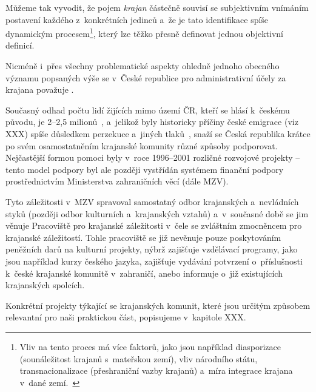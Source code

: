 Můžeme tak vyvodit, že pojem \emph{krajan} částečně souvisí se subjektivním vnímáním postavení každého z~konkrétních jedinců a~že je tato identifikace spíše dynamickým procesem\footnote{Vliv na tento proces má více faktorů, jako jsou například diasporizace (sounáležitost krajanů s~mateřskou zemí), vliv národního státu, transnacionalizace (přeshraniční vazby krajanů) a~míra integrace krajana v~dané zemí.~\parencite{Broucek2017}}, který lze těžko přesně definovat jednou objektivní definicí.

Nicméně i~přes všechny problematické aspekty ohledně jednoho obecného významu popsaných výše se v~České republice pro administrativní účely za krajana považuje .~\parencite{Krajane-mv1}

Současný odhad počtu lidí žijících mimo území ČR, kteří se hlásí k~českému původu, je 2--2,5 milionů~\parencite{Krajane-mv2}, a~jelikož byly historicky příčiny české emigrace (viz XXX) spíše důsledkem perzekuce a~jiných tlaků~\parencite{Vaculik2009a}, snaží se Česká republika krátce po svém osamostatněním krajanské komunity různé způsoby podporovat. Nejčastější formou pomoci byly v~roce 1996--2001 rozličné rozvojové projekty -- tento model podpory byl ale později vystřídán systémem finanční podpory prostřednictvím Ministerstva zahraničních věcí (dále MZV).~\parencite{Broucek2009}

Tyto záležitosti v~MZV spravoval samostatný odbor krajanských a~nevládních styků (později odbor kulturních a~krajanských vztahů) a~v~současné době se jim věnuje Pracoviště pro krajanské záležitosti v~čele se zvláštním zmocněncem pro krajanské záležitostí. Tohle pracoviště se již nevěnuje pouze poskytováním peněžních darů na kulturní projekty, nýbrž zajišťuje vzdělávací programy, jako jsou například kurzy českého jazyka, zajišťuje vydávání potvrzení o~příslušnosti k~české krajanské komunitě v~zahraničí, anebo informuje o~již existujících krajanských spolcích.~\parencite{Krajane-mv3}

Konkrétní projekty týkající se krajanských komunit, které jsou určitým způsobem relevantní pro naši praktickou část, popisujeme v~kapitole XXX.
